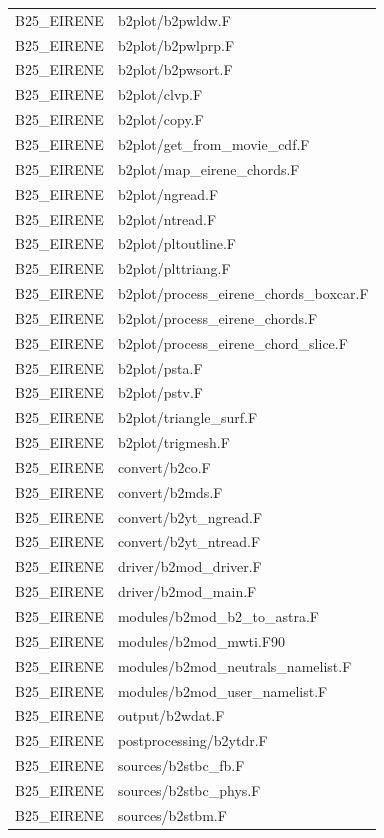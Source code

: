\documentclass[a4paper,10pt]{report}
\begin{document}
\begin{center}
\begin{longtable}{|l|l|}
B25\_EIRENE & b2plot/b2pwldw.F \\
B25\_EIRENE & b2plot/b2pwlprp.F \\
B25\_EIRENE & b2plot/b2pwsort.F \\
B25\_EIRENE & b2plot/clvp.F \\
B25\_EIRENE & b2plot/copy.F \\
B25\_EIRENE & b2plot/get\_from\_movie\_cdf.F \\
B25\_EIRENE & b2plot/map\_eirene\_chords.F \\
B25\_EIRENE & b2plot/ngread.F \\
B25\_EIRENE & b2plot/ntread.F \\
B25\_EIRENE & b2plot/pltoutline.F \\
B25\_EIRENE & b2plot/plttriang.F \\
B25\_EIRENE & b2plot/process\_eirene\_chords\_boxcar.F \\
B25\_EIRENE & b2plot/process\_eirene\_chords.F \\
B25\_EIRENE & b2plot/process\_eirene\_chord\_slice.F \\
B25\_EIRENE & b2plot/psta.F \\
B25\_EIRENE & b2plot/pstv.F \\
B25\_EIRENE & b2plot/triangle\_surf.F \\
B25\_EIRENE & b2plot/trigmesh.F \\
B25\_EIRENE & convert/b2co.F \\
B25\_EIRENE & convert/b2mds.F \\
B25\_EIRENE & convert/b2yt\_ngread.F \\
B25\_EIRENE & convert/b2yt\_ntread.F \\
B25\_EIRENE & driver/b2mod\_driver.F \\
B25\_EIRENE & driver/b2mod\_main.F \\
B25\_EIRENE & modules/b2mod\_b2\_to\_astra.F \\
B25\_EIRENE & modules/b2mod\_mwti.F90 \\
B25\_EIRENE & modules/b2mod\_neutrals\_namelist.F \\
B25\_EIRENE & modules/b2mod\_user\_namelist.F \\
B25\_EIRENE & output/b2wdat.F \\
B25\_EIRENE & postprocessing/b2ytdr.F \\
B25\_EIRENE & sources/b2stbc\_fb.F \\
B25\_EIRENE & sources/b2stbc\_phys.F \\
B25\_EIRENE & sources/b2stbm.F \\

\end{longtable}
\end{center}
\end{document}
